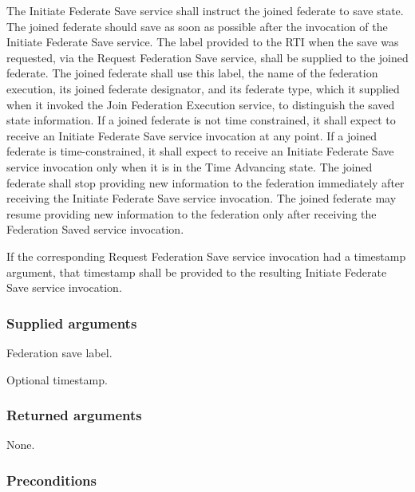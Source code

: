 The Initiate Federate Save \rtiinitiated{} service shall instruct the joined federate to save state. The joined federate should save as soon as possible after the invocation of the Initiate Federate Save \rtiinitiated{} service. The label provided to the RTI when the save was requested, via the Request Federation Save service, shall be supplied to the joined federate. The joined federate shall use this label, the name of the federation execution, its joined federate designator, and its federate type, which it supplied when it invoked the Join Federation Execution service, to distinguish the saved state information. If a joined federate is not time constrained, it shall expect to receive an Initiate Federate Save \rtiinitiated{} service invocation at any point. If a joined federate is time-constrained, it shall expect to receive an Initiate Federate Save \rtiinitiated{} service invocation only when it is in the Time Advancing state. The joined federate shall stop providing new information to the federation immediately after receiving the Initiate Federate Save \rtiinitiated{} service invocation. The joined federate may resume providing new information to the federation only after receiving the Federation Saved \rtiinitiated{} service invocation.

If the corresponding Request Federation Save service invocation had a timestamp argument, that timestamp shall be provided to the resulting Initiate Federate Save\rtiinitiated{} service invocation.

\subsubsection{Supplied arguments}

\begin{stdalphalist}
    \item Federation save label.
    \item Optional timestamp.
\end{stdalphalist}

\subsubsection{Returned arguments}

\begin{stdalphalist}
    \item None.
\end{stdalphalist}

\subsubsection{Preconditions}

